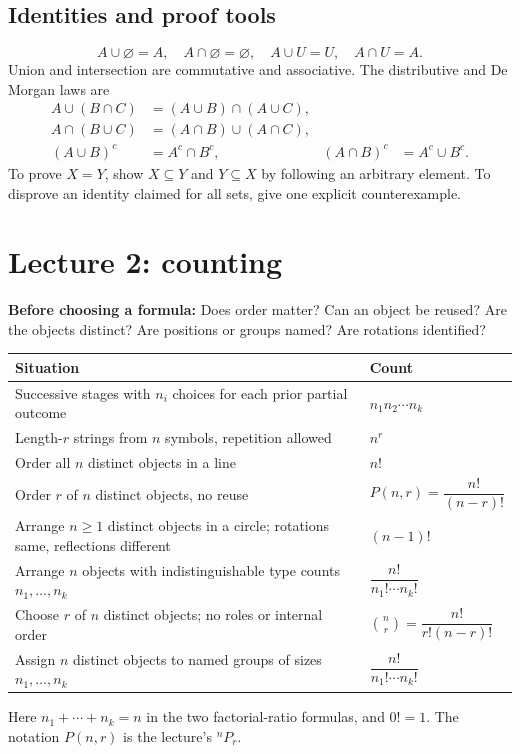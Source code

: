 \documentclass[11pt,letterpaper]{article}
\begin{document}
\subsection*{Identities and proof tools}
\[
A\cup\varnothing=A,\quad A\cap\varnothing=\varnothing,\quad
A\cup U=U,\quad A\cap U=A.
\]
Union and intersection are commutative and associative. The distributive and De Morgan laws are
\begin{align*}
A\cup(B\cap C)&=(A\cup B)\cap(A\cup C),\\
A\cap(B\cup C)&=(A\cap B)\cup(A\cap C),\\
(A\cup B)^c&=A^c\cap B^c, & (A\cap B)^c&=A^c\cup B^c.
\end{align*}
To prove $X=Y$, show $X\subseteq Y$ and $Y\subseteq X$ by following an arbitrary element. To disprove an identity claimed for all sets, give one explicit counterexample.
\newpage
\begingroup\small\setlength{\parskip}{4pt}
\section*{Lecture 2: counting}
\textbf{Before choosing a formula:} Does order matter? Can an object be reused? Are the objects distinct? Are positions or groups named? Are rotations identified?
\begin{center}
\renewcommand{\arraystretch}{1.15}
\begin{tabular}{@{}p{3.95in}p{2.9in}@{}}
\toprule
Situation & Count \\
\midrule
Successive stages with $n_i$ choices for each prior partial outcome & $n_1n_2\cdots n_k$ \\
Length-$r$ strings from $n$ symbols, repetition allowed & $n^r$ \\
Order all $n$ distinct objects in a line & $n!$ \\
Order $r$ of $n$ distinct objects, no reuse & $P(n,r)=\dfrac{n!}{(n-r)!}$ \\
Arrange $n\ge1$ distinct objects in a circle; rotations same, reflections different & $(n-1)!$ \\
Arrange $n$ objects with indistinguishable type counts $n_1,\ldots,n_k$ & $\dfrac{n!}{n_1!\cdots n_k!}$ \\
Choose $r$ of $n$ distinct objects; no roles or internal order & $\binom nr=\dfrac{n!}{r!(n-r)!}$ \\
Assign $n$ distinct objects to named groups of sizes $n_1,\ldots,n_k$ & $\dfrac{n!}{n_1!\cdots n_k!}$ \\
\bottomrule
\end{tabular}
\end{center}
Here $n_1+\cdots+n_k=n$ in the two factorial-ratio formulas, and $0!=1$. The notation $P(n,r)$ is the lecture's ${}^nP_r$.
\end{document}
